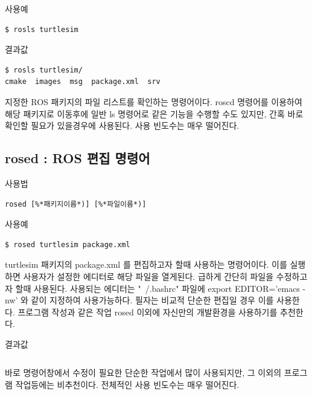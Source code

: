 \noindent
{}\circled{\thenum} 사용예
\begin{lstlisting}[language=ROS]
$ rosls turtlesim
\end{lstlisting}

\noindent
{}\circled{\thenum} 결과값
\begin{lstlisting}[language=ROS]
$ rosls turtlesim/
cmake  images  msg  package.xml  srv
\end{lstlisting}

\noindent
지정한 ROS 패키지의 파일 리스트를 확인하는 명령어이다. roscd 명령어를 이용하여 해당 패키지로 이동후에 일반 ls 명령어로 같은 기능을 수행할 수도 있지만, 간혹 바로 확인할 필요가 있을경우에 사용된다. 사용 빈도수는 매우 떨어진다.

\subsection{rosed : ROS 편집 명령어}

\setcounter{num}{0}

\circled{\thenum} 사용법
\begin{lstlisting}[language=ROS]
rosed [%*패키지이름*)] [%*파일이름*)]
\end{lstlisting}

\noindent
{}\circled{\thenum} 사용예
\begin{lstlisting}[language=ROS]
$ rosed turtlesim package.xml 
\end{lstlisting}

\noindent
turtlesim 패키지의 package.xml 를 편집하고자 할때 사용하는 명령어이다. 이를 실행하면 사용자가 설정한 에디터로 해당 파일을 열게된다. 급하게 간단히 파일을 수정하고자 할때 사용된다. 사용되는 에디터는 "~/.bashrc" 파일에 export EDITOR='emacs -nw' 와 같이 지정하여 사용가능하다. 필자는 비교적 단순한 편집일 경우 이를 사용한다. 프로그램 작성과 같은 작업 rosed 이외에 자신만의 개발환경을 사용하기를 추천한다.

\vspace{\baselineskip}
\noindent
{}\circled{\thenum} 결과값
\begin{lstlisting}[language=ROS]
%*사용자가 지정해둔 에디터를 이용하여 해당 파일을 열게된다.*)
\end{lstlisting}

\noindent
바로 명령어창에서 수정이 필요한 단순한 작업에서 많이 사용되지만, 그 이외의 프로그램 작업등에는 비추천이다. 전체적인 사용 빈도수는 매우 떨어진다.

